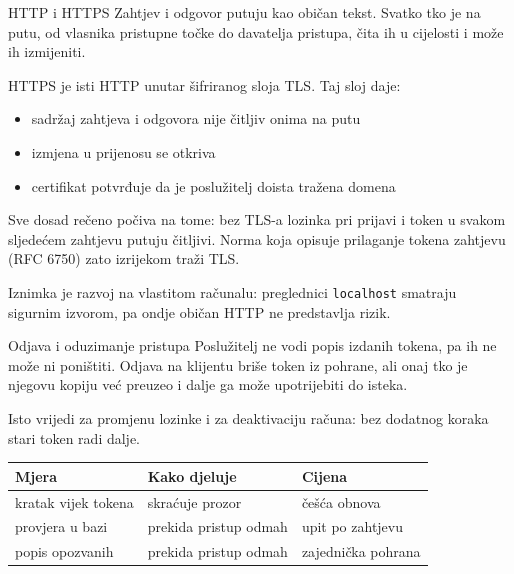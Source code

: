 
\begin{frame}{HTTP i HTTPS}
Zahtjev i odgovor putuju kao običan tekst. Svatko tko je na putu, od vlasnika pristupne točke do davatelja pristupa, čita ih u cijelosti i može ih izmijeniti.

\vspace{1.1em}
HTTPS je isti HTTP unutar šifriranog sloja TLS. Taj sloj daje:

\begin{itemize}
  \item sadržaj zahtjeva i odgovora nije čitljiv onima na putu
  \item izmjena u prijenosu se otkriva
  \item certifikat potvrđuje da je poslužitelj doista tražena domena
\end{itemize}

\vspace{1.1em}
Sve dosad rečeno počiva na tome: bez TLS-a lozinka pri prijavi i token u svakom sljedećem zahtjevu putuju čitljivi. Norma koja opisuje prilaganje tokena zahtjevu (RFC 6750) zato izrijekom traži TLS.

\vspace{1.1em}
Iznimka je razvoj na vlastitom računalu: preglednici \texttt{localhost} smatraju sigurnim izvorom, pa ondje običan HTTP ne predstavlja rizik.
\end{frame}

\begin{frame}{Odjava i oduzimanje pristupa}
Poslužitelj ne vodi popis izdanih tokena, pa ih ne može ni poništiti. Odjava na klijentu briše token iz pohrane, ali onaj tko je njegovu kopiju već preuzeo i dalje ga može upotrijebiti do isteka.

\vspace{1.1em}
Isto vrijedi za promjenu lozinke i za deaktivaciju računa: bez dodatnog koraka stari token radi dalje.

\vspace{0.6em}
{\small
\setlength{\tabcolsep}{8pt}
\renewcommand{\arraystretch}{1.35}
\begin{tabular}{@{}lll@{}}
  \toprule
  \textbf{Mjera} & \textbf{Kako djeluje} & \textbf{Cijena} \\
  \midrule
  kratak vijek tokena & skraćuje prozor        & češća obnova \\
  provjera u bazi     & prekida pristup odmah  & upit po zahtjevu \\
  popis opozvanih     & prekida pristup odmah  & zajednička pohrana \\
  \bottomrule
\end{tabular}
}

\end{frame}

